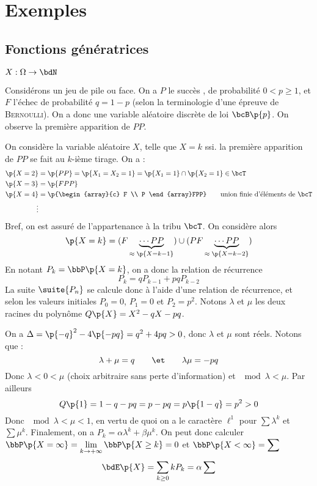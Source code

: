 \documentclass[a4paper,french,bookmarks]{book}
\begin{document}
    \section{Exemples}
    
    \subsection{Fonctions génératrices}
    
    $X : \Omega \to \bdN$
    
    
    \newpage
    
    Considérons un jeu de pile ou face. On a $P$ le succès , de probabilité $0 < p \geq 1$, et $F$ l'échec  de probabilité $q = 1 - p$ (selon la terminologie d'une épreuve de \textsc{Bernoulli}). On a donc une variable aléatoire discrète de loi $\bcB\p{p}$. On observe la première apparition de $PP$.\medskip
    
    On considère la variable aléatoire $X$, telle que $X = k$ ssi. la première apparition de $PP$ se fait au $k$-ième tirage. On a :
    \begin{align*}
        \p{X = 2} &= \p{PP} = \p{X_1 = X_2 = 1} = \p{X_1 = 1} \cap \p{X_2 = 1} \in \bcT\\
        \p{X = 3} &= \p{FPP}\\
        \p{X = 4} &= \p{\begin{array}{c}
            F  \\
            P
        \end{array}FPP} \qquad\text{union finie d'éléments de } \bcT\\
        \vdots
    \end{align*}
    Bref, on est assuré de l'appartenance à la tribu $\bcT$. On considère alors
    \[ \p{X = k} = (F\underbrace{ \cdots PP}_{\approx\; \p{X = k-1}}) \cup (PF\underbrace{\cdots PP}_{\approx\; \p{X = k-2}})\]
    En notant $P_k = \bbP\p{X = k}$, on a donc la relation de récurrence
    \[ P_k = qP_{k-1} + pqP_{k-2} \]
    La suite $\suite{P_n}$ se calcule donc à l'aide d'une relation de récurrence, et selon les valeurs initiales $P_0 = 0$, $P_1 = 0$ et $P_2 = p^2$. Notons $\lambda$ et $\mu$ les deux racines du polynôme $Q\p{X} = X^2 - qX - pq$.
    
    On a $\Delta = \p{-q}^2 -4\p{-pq} = q^2 + 4pq > 0$, donc $\lambda$ et $\mu$ sont réels. Notons que :
    \[ \lambda + \mu = q \qquad\et\qquad \lambda \mu = -pq\]
    Donc $\lambda < 0 < \mu$ (choix arbitraire sans perte d'information) et $\mod{\lambda} < \mu$. Par ailleurs 
    \[ Q\p{1} = 1 - q - pq = p - pq = p\p{1 - q} = p^2 > 0\]
    Donc $\mod{\lambda} <  \mu < 1$, en vertu de quoi on a le caractère $\ell^1$ pour $\sum \lambda^k$ et $\sum \mu^k$. Finalement, on a $P_k = \alpha \lambda^k + \beta \mu^k$. On peut donc calculer $\bbP\p{X = \infty} = \lim\limits_{k \to +\infty} \bbP\p{X \geq k} = 0$ et $\bbP\p{X < \infty} = \displaystyle\sum$
    \[ \bdE\p{X} = \sum_{k \geq 0} kP_k = \alpha\sum_{}\]
    
\end{document}
